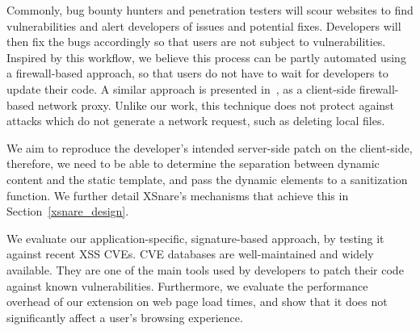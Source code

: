 Commonly, bug bounty hunters and penetration testers will scour
websites to find vulnerabilities and alert developers of issues 
and potential fixes. Developers will then fix the bugs
accordingly so that users are not subject to vulnerabilities. Inspired
by this workflow, we believe this process can be partly automated
using a firewall-based approach, so that users do not have to wait for
developers to update their code. A similar approach is presented in~\cite{Kirda:2009:CCS:2639535.2639808}, as a client-side firewall-based 
network proxy. %
Unlike our work, this technique does not protect against
attacks which do not generate a network request, such as deleting local
files. 




We aim to reproduce the developer's intended server-side patch on the
client-side, therefore, we need to be able to determine the separation
between dynamic content and the static template, and pass the dynamic
elements to a sanitization function. We further detail XSnare's
mechanisms that achieve this in Section~\ref{xsnare_design}.

We evaluate our application-specific, signature-based approach, by
testing it against recent \ac{XSS} CVEs. CVE databases are
well-maintained and widely available. They are one of the main tools
used by developers to patch their code against known
vulnerabilities. Furthermore, we evaluate the performance overhead of
our extension on web page load times, and show that it does not
significantly affect a user's browsing experience.

